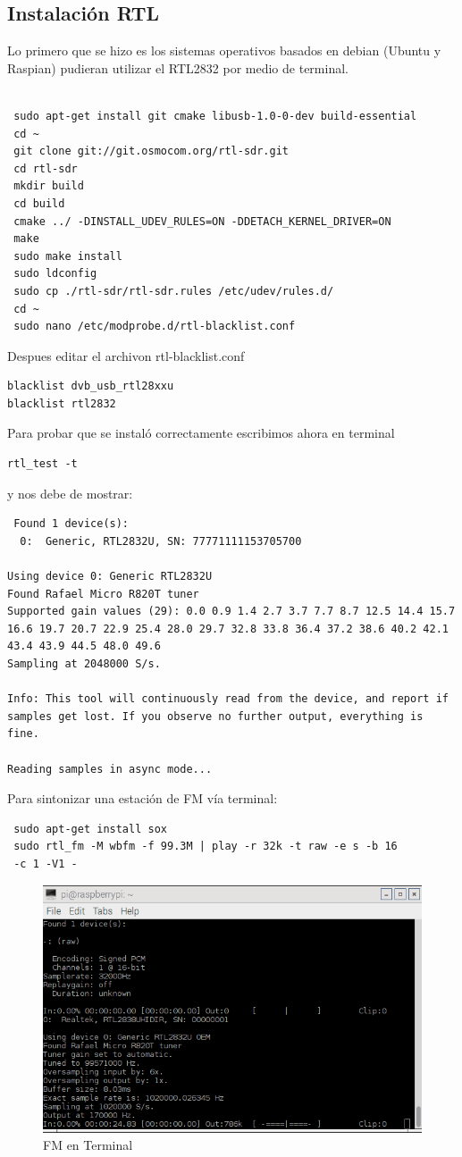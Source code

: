 \documentclass[preprint,12pt]{elsarticle}
\begin{document}
\subsection{Instalación RTL}
Lo primero que se hizo es los sistemas operativos basados en debian (Ubuntu y Raspian) pudieran utilizar el RTL2832 por medio de terminal.
\begin{lstlisting}

 sudo apt-get install git cmake libusb-1.0-0-dev build-essential
 cd ~
 git clone git://git.osmocom.org/rtl-sdr.git
 cd rtl-sdr
 mkdir build
 cd build
 cmake ../ -DINSTALL_UDEV_RULES=ON -DDETACH_KERNEL_DRIVER=ON
 make
 sudo make install
 sudo ldconfig
 sudo cp ./rtl-sdr/rtl-sdr.rules /etc/udev/rules.d/ 
 cd ~
 sudo nano /etc/modprobe.d/rtl-blacklist.conf
\end{lstlisting}
Despues editar el archivon rtl-blacklist.conf
\begin{lstlisting}
blacklist dvb_usb_rtl28xxu
blacklist rtl2832

\end{lstlisting}

Para probar que se instaló correctamente escribimos ahora en terminal
\begin{lstlisting}
rtl_test -t
\end{lstlisting}
y nos debe de mostrar:

\begin{lstlisting}
 Found 1 device(s):
  0:  Generic, RTL2832U, SN: 77771111153705700

Using device 0: Generic RTL2832U
Found Rafael Micro R820T tuner
Supported gain values (29): 0.0 0.9 1.4 2.7 3.7 7.7 8.7 12.5 14.4 15.7 
16.6 19.7 20.7 22.9 25.4 28.0 29.7 32.8 33.8 36.4 37.2 38.6 40.2 42.1 
43.4 43.9 44.5 48.0 49.6
Sampling at 2048000 S/s.

Info: This tool will continuously read from the device, and report if
samples get lost. If you observe no further output, everything is fine.

Reading samples in async mode...
 \end{lstlisting}
Para sintonizar una estación de FM vía terminal:
 
 
 \begin{lstlisting}
 sudo apt-get install sox
 sudo rtl_fm -M wbfm -f 99.3M | play -r 32k -t raw -e s -b 16 
 -c 1 -V1 -
  \end{lstlisting}
  
 \begin{figure}[htbp!]
\centering\includegraphics[width=0.7\linewidth]{terminalRadio.png}
\caption{FM en Terminal}
\label{freqRDS}
\end{figure}
  
\end{document}
